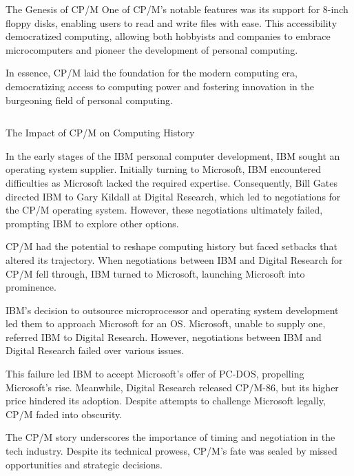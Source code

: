 \documentclass{beamer}
\begin{document}
\begin{frame}[t]{}
\begin{columns}
\begin{column}[T]{0.72\textwidth}
\begin{block}{\large The Genesis of CP/M}
One of CP/M's notable features was its support for 8-inch floppy disks, enabling users to read and write files with ease. This accessibility democratized computing, allowing both hobbyists and companies to embrace microcomputers and pioneer the development of personal computing.

In essence, CP/M laid the foundation for the modern computing era, democratizing access to computing power and fostering innovation in the burgeoning field of personal computing.\cite{giants}

\end{block}

\begin{columns}[t]

\begin{column}{0.52\textwidth}
\begin{block}{\large The Impact of CP/M on Computing History}

  In the early stages of the IBM personal computer development, IBM sought an operating system supplier. Initially turning to Microsoft, IBM encountered difficulties as Microsoft lacked the required expertise. Consequently, Bill Gates directed IBM to Gary Kildall at Digital Research, which led to negotiations for the CP/M operating system. However, these negotiations ultimately failed, prompting IBM to explore other options.

CP/M had the potential to reshape computing history but faced setbacks that altered its trajectory. When negotiations between IBM and Digital Research for CP/M fell through, IBM turned to Microsoft, launching Microsoft into prominence.

IBM's decision to outsource microprocessor and operating system development led them to approach Microsoft for an OS. Microsoft, unable to supply one, referred IBM to Digital Research. However, negotiations between IBM and Digital Research failed over various issues.

This failure led IBM to accept Microsoft's offer of PC-DOS, propelling Microsoft's rise. Meanwhile, Digital Research released CP/M-86, but its higher price hindered its adoption. Despite attempts to challenge Microsoft legally, CP/M faded into obscurity.

The CP/M story underscores the importance of timing and negotiation in the tech industry. Despite its technical prowess, CP/M's fate was sealed by missed opportunities and strategic decisions.\cite{giants}


\end{block}


\end{column}
\end{columns}
\end{column}
\end{columns}
\end{frame}
\end{document}
